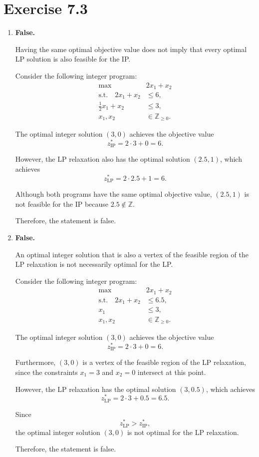 \documentclass{Group_Templ}
\begin{document}
\section*{Exercise 7.3}
\begin{enumerate}
	\item 
	\textbf{False.}
	
	Having the same optimal objective value does not imply
	that every optimal LP solution is also feasible for the IP.
	
	Consider the following integer program:
	\begin{align*}
		\max \quad &2x_1+x_2\\
		\text{s.t.}\quad
		2x_1+x_2 &\leq 6,\\
		\frac{1}{2}x_1+x_2 &\leq 3,\\
		x_1,x_2 &\in \mathbb{Z}_{\geq 0}.
	\end{align*}
	
	The optimal integer solution $(3,0)$ achieves
	the objective value
	\[
	z_{\mathrm{IP}}^*=2\cdot3+0=6.
	\]
	
	However, the LP relaxation also has the optimal
	solution $(2.5,1)$, which achieves
	\[
	z_{\mathrm{LP}}^*=2\cdot2.5+1=6.
	\]
	
	Although both programs have the same optimal
	objective value, $(2.5,1)$ is not feasible for
	the IP because $2.5\notin\mathbb{Z}$.
	
	Therefore, the statement is false.

	\item
	\textbf{False.}
	
	An optimal integer solution that is also a vertex of
	the feasible region of the LP relaxation is not
	necessarily optimal for the LP.
	
	Consider the following integer program:
	\begin{align*}
		\max \quad &2x_1+x_2\\
		\text{s.t.}\quad
		2x_1+x_2 &\leq 6.5,\\
		x_1 &\leq 3,\\
		x_1,x_2 &\in \mathbb{Z}_{\geq 0}.
	\end{align*}
	
	The optimal integer solution $(3,0)$ achieves
	the objective value
	\[
	z_{\mathrm{IP}}^*=2\cdot3+0=6.
	\]
	
	Furthermore, $(3,0)$ is a vertex of the feasible
	region of the LP relaxation, since the constraints
	$x_1=3$ and $x_2=0$ intersect at this point.
	
	However, the LP relaxation has the optimal
	solution $(3,0.5)$, which achieves
	\[
	z_{\mathrm{LP}}^*=2\cdot3+0.5=6.5.
	\]
	
	Since
	\[
	z_{\mathrm{LP}}^*>z_{\mathrm{IP}}^*,
	\]
	the optimal integer solution $(3,0)$ is not
	optimal for the LP relaxation.
	
	Therefore, the statement is false.

\end{enumerate}
\end{document}
